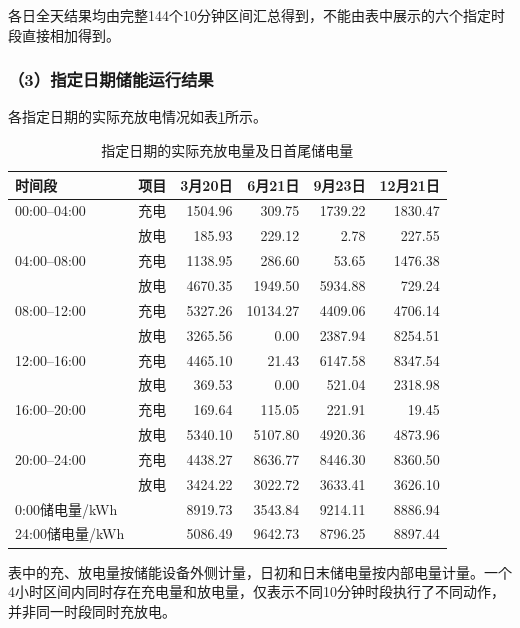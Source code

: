各日全天结果均由完整144个10分钟区间汇总得到，不能由表中展示的六个指定时段直接相加得到。


\subsubsection*{（3）指定日期储能运行结果}

各指定日期的实际充放电情况如表\ref{tab:q2_storage}所示。

\begin{table}[H]
\centering
\caption{指定日期的实际充放电量及日首尾储电量}
\label{tab:q2_storage}
\begin{tabular}{llrrrr}
\hline
时间段 & 项目 & 3月20日 & 6月21日 & 9月23日 & 12月21日 \\
\hline
00:00--04:00 & 充电
& 1504.96 & 309.75 & 1739.22 & 1830.47 \\
& 放电
& 185.93 & 229.12 & 2.78 & 227.55 \\

04:00--08:00 & 充电
& 1138.95 & 286.60 & 53.65 & 1476.38 \\
& 放电
& 4670.35 & 1949.50 & 5934.88 & 729.24 \\

08:00--12:00 & 充电
& 5327.26 & 10134.27 & 4409.06 & 4706.14 \\
& 放电
& 3265.56 & 0.00 & 2387.94 & 8254.51 \\

12:00--16:00 & 充电
& 4465.10 & 21.43 & 6147.58 & 8347.54 \\
& 放电
& 369.53 & 0.00 & 521.04 & 2318.98 \\

16:00--20:00 & 充电
& 169.64 & 115.05 & 221.91 & 19.45 \\
& 放电
& 5340.10 & 5107.80 & 4920.36 & 4873.96 \\

20:00--24:00 & 充电
& 4438.27 & 8636.77 & 8446.30 & 8360.50 \\
& 放电
& 3424.22 & 3022.72 & 3633.41 & 3626.10 \\
\hline
0:00储电量/kWh & 
& 8919.73 & 3543.84 & 9214.11 & 8886.94 \\
24:00储电量/kWh &
& 5086.49 & 9642.73 & 8796.25 & 8897.44 \\
\hline
\end{tabular}
\end{table}

表中的充、放电量按储能设备外侧计量，日初和日末储电量按内部电量计量。一个4小时区间内同时存在充电量和放电量，仅表示不同10分钟时段执行了不同动作，并非同一时段同时充放电。


